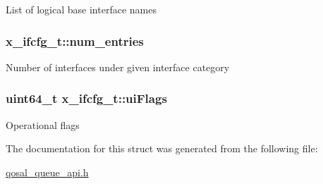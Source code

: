 List of logical base interface names \hypertarget{structx__ifcfg__t_ad6a9705c42a0090aa7ed0d4a6b9b1a55}{
\subsubsection[{num\-\_\-entries}]{ x\-\_\-ifcfg\-\_\-t\-::num\-\_\-entries}}\label{structx__ifcfg__t_ad6a9705c42a0090aa7ed0d4a6b9b1a55}
Number of interfaces under given interface category \hypertarget{structx__ifcfg__t_a8fd8c601b8624f82b34eb96673726d48}{
\subsubsection[{ui\-Flags}]{\setlength{\rightskip}{0pt plus 5cm}uint64\-\_\-t x\-\_\-ifcfg\-\_\-t\-::ui\-Flags}}\label{structx__ifcfg__t_a8fd8c601b8624f82b34eb96673726d48}
Operational flags 

The documentation for this struct was generated from the following file\-:\begin{DoxyCompactItemize}
\item 
\hyperlink{qosal__queue__api_8h}{qosal\-\_\-queue\-\_\-api.\-h}\end{DoxyCompactItemize}
